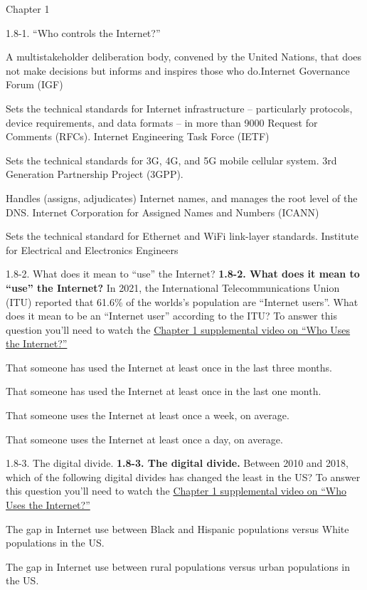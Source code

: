 \documentclass[a4paper]{article}
\begin{document}
\begin{quiz}{Chapter 1}
\begin{matching}[points=1,shuffle=true]{1.8-1. ``Who controls the Internet?''}
\item A multistakeholder deliberation body, convened by the United Nations, that does not make decisions but informs and inspires those who do.\answer Internet Governance Forum (IGF) 
\item Sets the technical standards for Internet infrastructure -- particularly protocols, device requirements, and data formats -- in more than 9000 Request for Comments (RFCs). \answer Internet Engineering Task Force (IETF) 
\item Sets the technical standards for 3G, 4G, and 5G mobile cellular system. \answer 3rd Generation Partnership Project (3GPP). 
\item Handles (assigns, adjudicates) Internet names, and manages the root level of the DNS. \answer Internet Corporation for Assigned Names and Numbers (ICANN) 
\item Sets the technical standard for Ethernet and WiFi link-layer standards. \answer Institute for Electrical and Electronics Engineers
\end{matching}

\begin{multi}[points=1,shuffle=true]{1.8-2. What does it mean to ``use'' the Internet?}
\textbf{1.8-2. What does it mean to ``use'' the Internet?} 
In 2021, the International Telecommunications Union (ITU) reported that 61.6\% of the worlds's population are ``Internet users''.  What does it mean to be an ``Internet user'' according to the ITU? 
To answer this question you'll need to watch the \href{https://www.youtube.com/watch?v=-YaGGf8C1A4}{Chapter 1 supplemental video on ``Who Uses the Internet?''}
\item* That someone has used the Internet at least once in the last three months.
\item That someone has used the Internet at least once in the last one month.
\item That someone uses the Internet at least once a week, on average.
\item That someone uses the Internet at least once a day, on average.
\end{multi}

\begin{multi}[points=1,shuffle=true]{1.8-3. The digital divide.}
\textbf{1.8-3.  The digital divide.} 
Between 2010 and 2018, which of the following digital divides has changed the least in the US? 
To answer this question you'll need to watch the \href{https://www.youtube.com/watch?v=-YaGGf8C1A4}{Chapter 1 supplemental video on ``Who Uses the Internet?''}
\item* The gap in Internet use between Black and Hispanic populations versus White populations in the US.
\item The gap in Internet use between rural populations versus urban populations in the US.
\end{multi}

\end{quiz}
\end{document}
